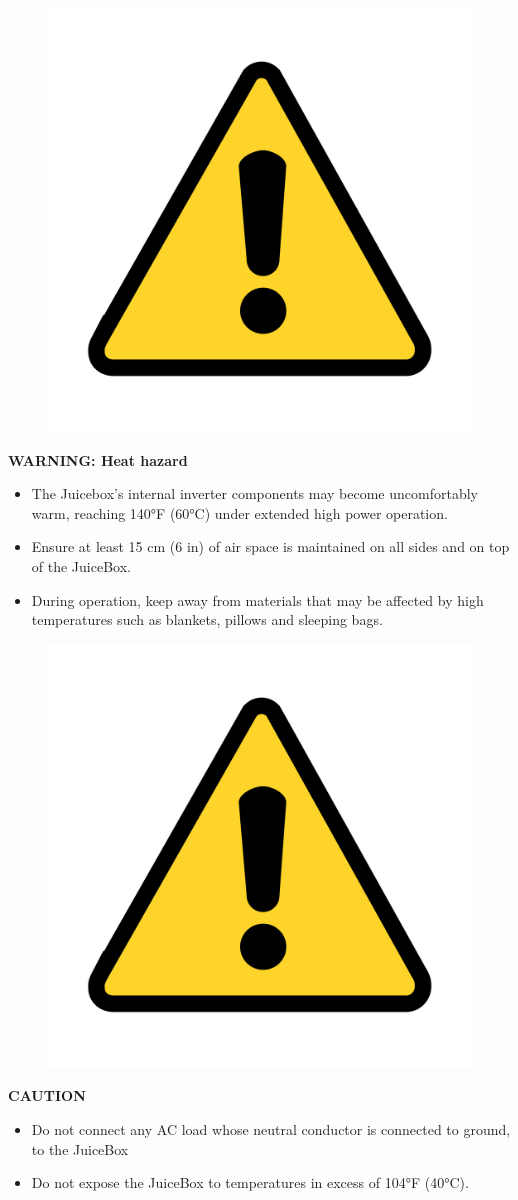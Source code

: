 \documentclass[10pt]{article}
\begin{document}
\begin{figure}
    \centering
    \includegraphics[width=.75in]{warning_y}
\end{figure}

\vspace{5mm}

\noindent
\Large{\textbf{WARNING: Heat hazard}} \\
\begin{large}                                        
	\begin{itemize}
		\item{ The Juicebox's internal inverter components may become uncomfortably warm,
			reaching 140°F (60°C) under extended high power operation.}
		\item{Ensure at least 15 cm (6 in) of air space is maintained on all sides and on top of the JuiceBox.}
		\item{During operation, keep away from materials that may be affected by high
			temperatures such as blankets, pillows and sleeping bags.}
	\end{itemize}
\end{large}


\begin{figure}
    \centering
    \includegraphics[width=.75in]{warning_y}
\end{figure}

\vspace{5mm}

\noindent   
\Large{\textbf{CAUTION}} \\
\begin{large}                                        
	\begin{itemize}
		\item{Do not connect any AC load whose neutral conductor is connected to ground,
			to the JuiceBox}
		\item{Do not expose the JuiceBox to temperatures in excess of 104°F (40°C).}
	\end{itemize}
\end{large}
\end{document}
